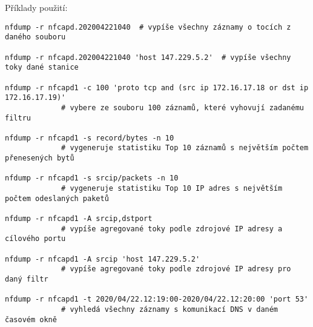 Příklady použití:
\begin{verbatim}
nfdump -r nfcapd.202004221040  # vypíše všechny záznamy o tocích z daného souboru

nfdump -r nfcapd.202004221040 'host 147.229.5.2'  # vypíše všechny toky dané stanice
 
nfdump -r nfcapd1 -c 100 'proto tcp and (src ip 172.16.17.18 or dst ip 172.16.17.19)'
             # vybere ze souboru 100 záznamů, které vyhovují zadanému filtru

nfdump -r nfcapd1 -s record/bytes -n 10
             # vygeneruje statistiku Top 10 záznamů s největším počtem přenesených bytů

nfdump -r nfcapd1 -s srcip/packets -n 10
             # vygeneruje statistiku Top 10 IP adres s největším počtem odeslaných paketů

nfdump -r nfcapd1 -A srcip,dstport
             # vypíše agregované toky podle zdrojové IP adresy a cílového portu

nfdump -r nfcapd1 -A srcip 'host 147.229.5.2'
             # vypíše agregované toky podle zdrojové IP adresy pro daný filtr

nfdump -r nfcapd1 -t 2020/04/22.12:19:00-2020/04/22.12:20:00 'port 53'
             # vyhledá všechny záznamy s komunikací DNS v daném časovém okně 
\end{verbatim}

